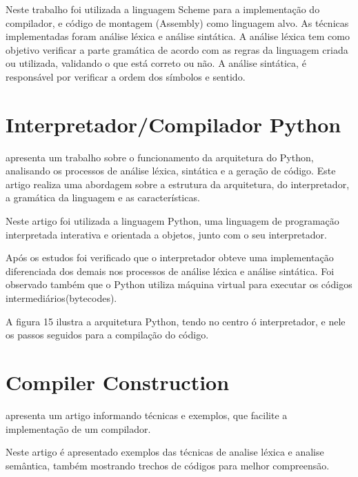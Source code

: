 \documentclass[12pt,oneside,a4paper,chapter=TITLE,section=TITLE,sumario=tradicional]{abntex2}
\begin{document}
Neste trabalho foi utilizada a linguagem Scheme para a implementação do compilador, e código de montagem (Assembly) como linguagem alvo. As técnicas implementadas foram análise léxica e análise sintática. A análise léxica tem como objetivo verificar a parte gramática de acordo com as regras da linguagem criada ou utilizada, validando o que está correto ou não. A análise sintática, é responsável por verificar a ordem dos símbolos e sentido.

\section{ Interpretador/Compilador Python}
\label{sec:interpretador-compilador}

\cite{eduardo2010} apresenta um trabalho sobre o funcionamento da arquitetura do Python, analisando os processos de análise léxica, sintática e a geração de código. Este artigo realiza uma abordagem sobre a estrutura da arquitetura, do interpretador, a gramática da linguagem e as características.

Neste artigo foi utilizada a linguagem Python, uma linguagem de programação interpretada interativa e orientada a objetos, junto com o seu interpretador.

Após os estudos foi verificado que o interpretador obteve uma implementação diferenciada dos demais nos processos de análise léxica e análise sintática. Foi observado também que o Python utiliza máquina virtual para executar os códigos intermediários(bytecodes).

A figura 15 ilustra a arquitetura Python, tendo no centro ó interpretador, e nele os passos seguidos para a compilação do código.

\begin{figure}[htb]
\end{figure}

\section{ Compiler Construction}
\label{sec:compiler-construction}

\cite{aastha2013} apresenta um artigo informando técnicas e exemplos, que facilite a implementação de um compilador. 

Neste artigo é apresentado exemplos das técnicas de analise léxica e analise semântica, também mostrando trechos de códigos para melhor compreensão.
\end{document}
